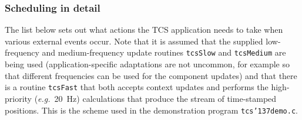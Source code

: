 \documentclass[12pt,fleqn,twoside]{article}
\renewcommand{\_}{{\tt\char'137}}     %
\begin{document}
\subsubsection{Scheduling in detail}
\label{scheduling}

The list below sets out what actions the TCS application needs to take
when various external events occur.  Note that it is assumed that the
supplied low-frequency and medium-frequency update routines
{\tt tcsSlow} and {\tt tcsMedium} are being
used (application-specific adaptations are not uncommon,
for example so that different frequencies can be used for the component
updates) and that there
is a routine {\tt tcsFast} that both accepts context
updates and performs the high-priority ({\it e.g.}~20~Hz) calculations
that produce the stream of time-stamped positions.  This is the scheme
used in the demonstration program {\tt tcs\_demo.c}.
\end{document}

